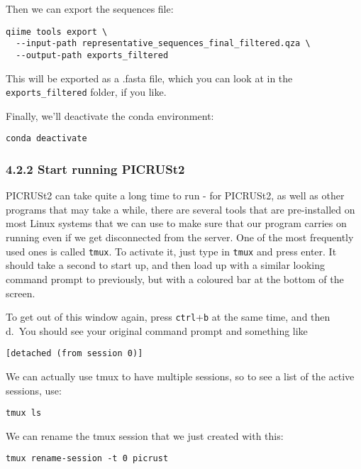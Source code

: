 \documentclass[
]{book}
\begin{document}
Then we can export the sequences file:

\begin{verbatim}
qiime tools export \
  --input-path representative_sequences_final_filtered.qza \
  --output-path exports_filtered
\end{verbatim}

This will be exported as a .fasta file, which you can look at in the \texttt{exports\_filtered} folder, if you like.

Finally, we'll deactivate the conda environment:

\begin{verbatim}
conda deactivate
\end{verbatim}

\subsubsection{4.2.2 Start running PICRUSt2}\label{start-running-picrust2}

PICRUSt2 can take quite a long time to run - for PICRUSt2, as well as other programs that may take a while, there are several tools that are pre-installed on most Linux systems that we can use to make sure that our program carries on running even if we get disconnected from the server. One of the most frequently used ones is called \texttt{tmux}. To activate it, just type in \texttt{tmux} and press enter. It should take a second to start up, and then load up with a similar looking command prompt to previously, but with a coloured bar at the bottom of the screen.

To get out of this window again, press \texttt{ctrl}+\texttt{b} at the same time, and then d.~You should see your original command prompt and something like

\begin{verbatim}
[detached (from session 0)]
\end{verbatim}

We can actually use tmux to have multiple sessions, so to see a list of the active sessions, use:

\begin{verbatim}
tmux ls
\end{verbatim}

We can rename the tmux session that we just created with this:

\begin{verbatim}
tmux rename-session -t 0 picrust
\end{verbatim}
\end{document}
